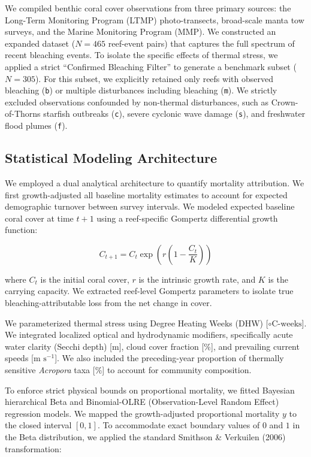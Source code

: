 \documentclass[
  letterpaper,
  DIV=11,
  numbers=noendperiod]{scrartcl}
\begin{document}
We compiled benthic coral cover observations from three primary sources:
the Long-Term Monitoring Program (LTMP) photo-transects, broad-scale
manta tow surveys, and the Marine Monitoring Program (MMP). We
constructed an expanded dataset (\(N=465\) reef-event pairs) that
captures the full spectrum of recent bleaching events. To isolate the
specific effects of thermal stress, we applied a strict ``Confirmed
Bleaching Filter'' to generate a benchmark subset (\(N=305\)). For this
subset, we explicitly retained only reefs with observed bleaching
(\texttt{b}) or multiple disturbances including bleaching (\texttt{m}).
We strictly excluded observations confounded by non-thermal
disturbances, such as Crown-of-Thorns starfish outbreaks (\texttt{c}),
severe cyclonic wave damage (\texttt{s}), and freshwater flood plumes
(\texttt{f}).

\subsection{Statistical Modeling
Architecture}\label{statistical-modeling-architecture}

We employed a dual analytical architecture to quantify mortality
attribution. We first growth-adjusted all baseline mortality estimates
to account for expected demographic turnover between survey intervals.
We modeled expected baseline coral cover at time \(t+1\) using a
reef-specific Gompertz differential growth function:

\[ C_{t+1} = C_t \exp\left(r \left(1 - \frac{C_t}{K}\right)\right) \]

where \(C_t\) is the initial coral cover, \(r\) is the intrinsic growth
rate, and \(K\) is the carrying capacity. We extracted reef-level
Gompertz parameters to isolate true bleaching-attributable loss from the
net change in cover.

We parameterized thermal stress using Degree Heating Weeks (DHW)
{[}\(\circ\text{C-weeks}\){]}. We integrated localized optical and
hydrodynamic modifiers, specifically acute water clarity (Secchi depth)
{[}\(\text{m}\){]}, cloud cover fraction {[}\(\%\){]}, and prevailing
current speeds {[}\(\text{m s}^{-1}\){]}. We also included the
preceding-year proportion of thermally sensitive \emph{Acropora} taxa
{[}\(\%\){]} to account for community composition.

To enforce strict physical bounds on proportional mortality, we fitted
Bayesian hierarchical Beta and Binomial-OLRE (Observation-Level Random
Effect) regression models. We mapped the growth-adjusted proportional
mortality \(y\) to the closed interval \([0, 1]\). To accommodate exact
boundary values of \(0\) and \(1\) in the Beta distribution, we applied
the standard Smithson \& Verkuilen (2006) transformation:
\end{document}
